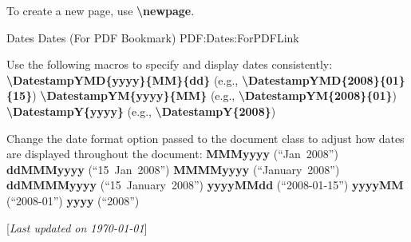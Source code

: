 \documentclass[letterpaper,MMMyyyy,nonstopmode]{simpleresumecv}
\newcommand{\CVNote}{Last updated on {\today}}
\newcommand{\Code}[1]{\mbox{\textbf{#1}}}
\newcommand{\CodeCommand}[1]{\mbox{\textbf{\textbackslash{#1}}}}
\begin{document}
\begin{Body}
\Gap
\BulletItem
To create a new page, use \CodeCommand{newpage}.

\BigGap
\SubSection
{Dates}
{Dates (For PDF Bookmark)}
{PDF:Dates:ForPDFLink}

\BigGap
\BulletItem
Use the following macros to specify and display dates consistently:
\SubBulletItem
\CodeCommand{DatestampYMD\{yyyy\}\{MM\}\{dd\}}
(e.g., \CodeCommand{DatestampYMD\{2008\}\{01\}\{15\}})
\SubBulletItem
\CodeCommand{DatestampYM\{yyyy\}\{MM\}}
(e.g., \CodeCommand{DatestampYM\{2008\}\{01\}})
\SubBulletItem
\CodeCommand{DatestampY\{yyyy\}}
(e.g., \CodeCommand{DatestampY\{2008\}})

\Gap
\BulletItem
Change the date format option passed to the document class to adjust how dates are displayed throughout the document:
\SubBulletItem
\Code{MMMyyyy} (``Jan~2008'')
\SubBulletItem
\Code{ddMMMyyyy} (``15~Jan~2008'')
\SubBulletItem
\Code{MMMMyyyy} (``January~2008'')
\SubBulletItem
\Code{ddMMMMyyyy} (``15~January~2008'')
\SubBulletItem
\Code{yyyyMMdd} (``2008-01-15'')
\SubBulletItem
\Code{yyyyMM} (``2008-01'')
\SubBulletItem
\Code{yyyy} (``2008'')

\endgroup

\end{Body}


\BigGap
\UseNoteFont%
\null\hfill%
[\textit{\CVNote}]
\end{document}
